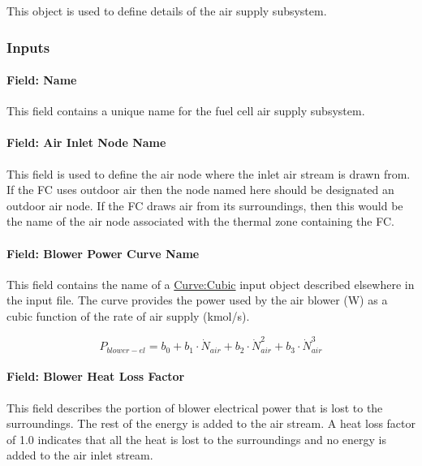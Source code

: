 This object is used to define details of the air supply subsystem.

\subsubsection{Inputs}\label{inputs-14-003}

\paragraph{Field: Name}\label{field-name-16-001}

This field contains a unique name for the fuel cell air supply subsystem.

\paragraph{Field: Air Inlet Node Name}\label{field-air-inlet-node-name-1-000}

This field is used to define the air node where the inlet air stream is drawn from. If the FC uses outdoor air then the node named here should be designated an outdoor air node. If the FC draws air from its surroundings, then this would be the name of the air node associated with the thermal zone containing the FC.

\paragraph{Field: Blower Power Curve Name}\label{field-blower-power-curve-name}

This field contains the name of a \hyperref[curvecubic]{Curve:Cubic} input object described elsewhere in the input file. The curve provides the power used by the air blower (W) as a cubic function of the rate of air supply (kmol/s).

\begin{equation}
{P_{blower - el}} = {b_0} + {b_1} \cdot {\dot N_{air}} + {b_2} \cdot \dot N_{air}^2 + {b_3} \cdot \dot N_{air}^3
\end{equation}

\paragraph{Field: Blower Heat Loss Factor}\label{field-blower-heat-loss-factor}

This field describes the portion of blower electrical power that is lost to the surroundings. The rest of the energy is added to the air stream. A heat loss factor of 1.0 indicates that all the heat is lost to the surroundings and no energy is added to the air inlet stream.

